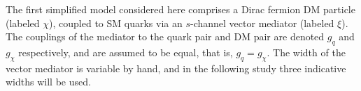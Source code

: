 
The first simplified model considered here comprises a Dirac fermion DM particle (labeled $\chi$), coupled to SM quarks via an $s$-channel vector mediator (labeled $\xi$). The couplings of the mediator to the quark pair and DM pair are denoted $g_q$ and $g_{\chi}$ respectively, and are assumed to be equal, that is, $g_q = g_{\chi}$. The width of the vector mediator is variable by hand, and in the following study three indicative widths will be used.

